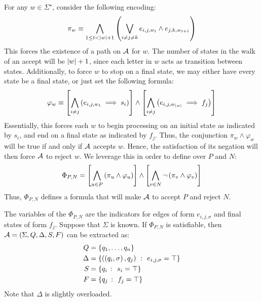 \documentclass[12pt]{article}
\begin{document}
For any \(w \in \Sigma^\star\), consider the following encoding:
\begin{align*}
  \pi_w \equiv
    \bigwedge_{1 \leq t < \left\lvert w\right\rvert + 1}
      \left(\bigvee_{i \neq j \neq k}
        e_{i, j, w_t} \land e_{j, k, w_{t + 1}}\right)
\end{align*}
This forces the existence of a path on \(\mathcal{A}\) for \(w\).
The number of states in the walk of an accept will be \(\left\lvert w\right\rvert + 1\),
since each letter in \(w\) acts as transition between states.
Additionally, to force \(w\) to stop on a final state,
we may either have every state be a final state,
or just set the following formula:
\begin{align*}
  \varphi_w \equiv
    \left[\bigwedge_{i \neq j} \left(e_{i, j, w_{1}} \implies s_i\right)\right]
      \land
    \left[\bigwedge_{i \neq j} \left(e_{i, j, w_{\left\lvert w\right\rvert}} \implies f_j\right)\right]
\end{align*}
Essentially, this forces each \(w\) to begin processing on an initial state
as indicated by \(s_i\), and end on a final state as indicated by \(f_j\).
Thus, the conjunction \(\pi_w \land \varphi_w\) will be true if and
only if \(\mathcal{A}\) accepts \(w\).
Hence, the satisfaction of
its negation will then force \(\mathcal{A}\) to reject \(w\).
We leverage this in order to define
over \(P\) and \(N\):
\begin{align*}
  \Phi_{P, N} =
    \left[\bigwedge_{u \in P} \left(\pi_u \land \varphi_u\right)\right]
      \land
    \left[\bigwedge_{v \in N} \neg\left(\pi_v \land \varphi_v\right)\right]
\end{align*}
Thus, \(\Phi_{P, N}\) defines a formula that will make
\(\mathcal{A}\) to accept \(P\) and reject \(N\).

The variables of the \(\Phi_{P, N}\)
are the indicators for edges of form \(e_{i, j, \sigma}\) and
final states of form \(f_j\).
Suppose that \(\Sigma\) is known.
If \(\Phi_{P, N}\) is satisfiable,
then \(\mathcal{A} = \left(\Sigma, Q, \Delta, S, F\right)\) can be extracted as:
\begin{align*}
  Q &= \left\{q_1, \ldots, q_n\right\} \\
  \Delta &= \left\{\left(\left(q_i, \sigma\right), q_j\right) \ \colon\  e_{i, j, \sigma} = \top\right\} \\
  S &= \left\{q_i \ \colon\  s_i = \top\right\} \\
  F &= \left\{q_j \ \colon\  f_j = \top\right\} \\
\end{align*}
Note that \(\Delta\) is slightly overloaded.
\end{document}
